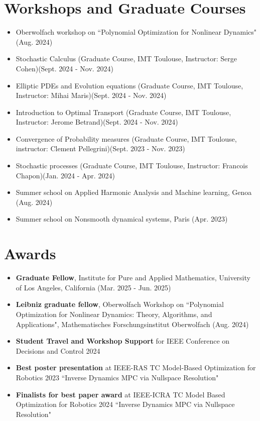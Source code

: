 \documentclass[letter]{res}
\begin{document}
\begin{resume}
\begin{itemize}
  \vspace{-2mm}
    \end{itemize}
   
\section{\textcolor{Bittersweet}{Workshops and Graduate Courses}}
\begin{itemize}
    \item Oberwolfach workshop on ``Polynomial Optimization for Nonlinear Dynamics" (Aug. 2024)
    \item Stochastic Calculus (Graduate Course, IMT Toulouse, Instructor: Serge Cohen)(Sept. 2024 - Nov. 2024)
    \item Elliptic PDEs and Evolution equations (Graduate Course, IMT Toulouse, Instructor: Mihai Maris)(Sept. 2024 - Nov. 2024)
    \item Introduction to Optimal Transport (Graduate Course, IMT Toulouse, Instructor: Jerome Betrand)(Sept. 2024 - Nov. 2024)
    \item Convergence of Probability measures (Graduate Course, IMT Toulouse, instructor: Clement Pellegrini)(Sept. 2023 - Nov. 2023)
    \item Stochastic processes (Graduate Course, IMT Toulouse, Instructor: Francois Chapon)(Jan. 2024 - Apr. 2024)
    \item Summer school on Applied Harmonic Analysis and Machine learning, Genoa (Aug. 2024)
    \item Summer school on Nonsmooth dynamical systems, Paris (Apr. 2023)
\end{itemize}

\section{\textcolor{Bittersweet}{Awards}}
\begin{itemize}
    \item \textbf{Graduate Fellow}, Institute for Pure and Applied Mathematics, University of Los Angeles, California (Mar. 2025 - Jun. 2025)
    \item \textbf{Leibniz graduate fellow}, Oberwolfach Workshop on ``Polynomial Optimization for Nonlinear Dynamics: Theory, Algorithms, and Applications", Mathematisches Forschungsinstitut Oberwolfach (Aug. 2024)
    \item \textbf{Student Travel and Workshop Support} for IEEE Conference on Decisions and Control 2024
    \item \textbf{Best poster presentation} at IEEE-RAS TC Model-Based Optimization  for Robotics 2023  ``Inverse Dynamics MPC via Nullspace Resolution"
    \item  \textbf{Finalists for best paper award} at IEEE-ICRA TC Model Based Optimization for Robotics 2024 ``Inverse Dynamics MPC via Nullspace Resolution"
\end{itemize}


\end{resume}
\end{document}
